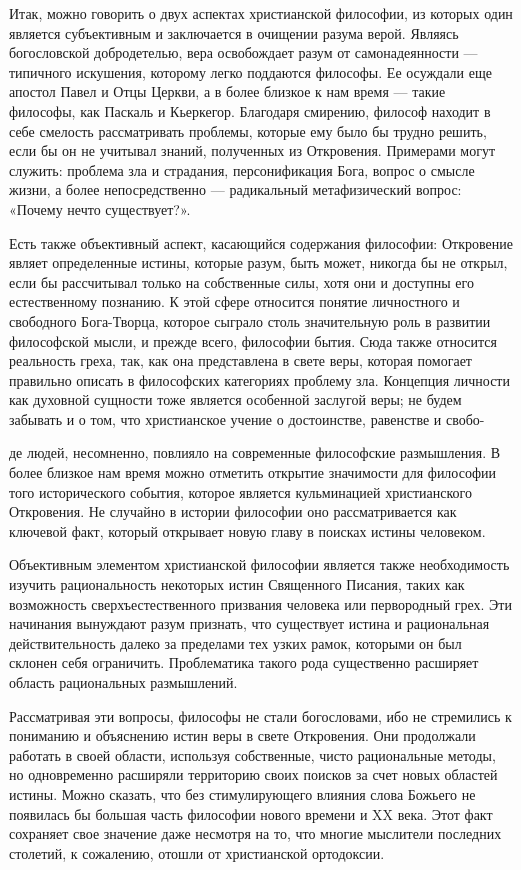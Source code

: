 \documentclass[a5paper,10pt]{article}
\begin{document}
Итак, можно говорить о двух аспектах христианской философии, из которых один
является субъективным и заключается в очищении разума верой. Являясь
богословской добродетелью, вера освобождает разум от самонадеянности —
типичного искушения, которому легко поддаются философы. Ее осуждали еще апостол
Павел и Отцы Церкви, а в более близкое к нам время — такие философы, как
Паскаль и Кьеркегор. Благодаря смирению, философ находит в себе смелость
рассматривать проблемы, которые ему было бы трудно решить, если бы он не
учитывал знаний, полученных из Откровения. Примерами могут служить: проблема
зла и страдания, персонификация Бога, вопрос о смысле жизни, а более
непосредственно — радикальный метафизический вопрос: «Почему нечто
существует?».

Есть также объективный аспект, касающийся содержания философии: Откровение
являет определенные истины, которые разум, быть может, никогда бы не открыл,
если бы рассчитывал только на собственные силы, хотя они и доступны его
естественному познанию. К этой сфере относится понятие личностного и свободного
Бога-Творца, которое сыграло столь значительную роль в развитии философской
мысли, и прежде всего, философии бытия. Сюда также относится реальность греха,
так, как она представлена в свете веры, которая помогает правильно описать в
философских категориях проблему зла. Концепция личности как духовной сущности
тоже является особенной заслугой веры; не будем забывать и о том, что
христианское учение о достоинстве, равенстве и свобо-

де людей, несомненно, повлияло на современные философские размышления. В более
близкое нам время можно отметить открытие значимости для философии того
исторического события, которое является кульминацией христианского Откровения.
Не случайно в истории философии оно рассматривается как ключевой факт, который
открывает новую главу в поисках истины человеком.

Объективным элементом христианской философии является также необходимость
изучить рациональность некоторых истин Священного Писания, таких как
возможность сверхъестественного призвания человека или первородный грех. Эти
начинания вынуждают разум признать, что существует истина и рациональная
действительность далеко за пределами тех узких рамок, которыми он был склонен
себя ограничить. Проблематика такого рода существенно расширяет область
рациональных размышлений.

Рассматривая эти вопросы, философы не стали богословами, ибо не стремились к
пониманию и объяснению истин веры в свете Откровения. Они продолжали работать в
своей области, используя собственные, чисто рациональные методы, но
одновременно расширяли территорию своих поисков за счет новых областей истины.
Можно сказать, что без стимулирующего влияния слова Божьего не появилась бы
большая часть философии нового времени и XX века. Этот факт сохраняет свое
значение даже несмотря на то, что многие мыслители последних столетий, к
сожалению, отошли от христианской ортодоксии.
\end{document}
